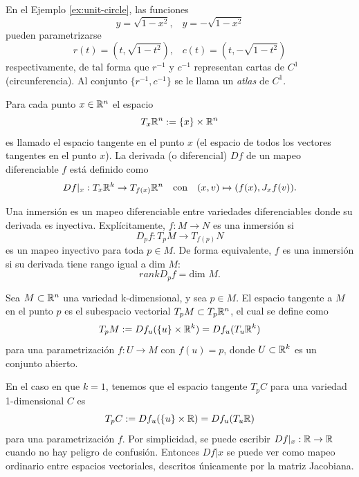 \begin{example}
    En el Ejemplo \ref{ex:unit-circle}, las funciones 
    $$y = \sqrt{1-x^{2}} \text{,} \quad y = -\sqrt{1-x^{2}}$$
    pueden parametrizarse
    $$ r(t)=(t,\sqrt{1-t^{2}}) \text{,} \quad c(t)=(t,-\sqrt{1-t^{2}}) $$
    respectivamente, de tal forma que $r^{-1}$ y $c^{-1}$ representan cartas
    de $C^{1}$ (circunferencia). Al conjunto $\{r^{-1}, c^{-1}\}$ se le llama
    un \emph{atlas} de $C^{1}$.
\end{example}

\begin{definition}
    Para cada punto $x \in \mathbb{R}^{n}$ el espacio
    $$ T_{x}\mathbb{R}^{n} := \{x\} \times \mathbb{R}^{n} $$
    es llamado el espacio tangente en el punto $x$ (el espacio de todos los vectores
    tangentes en el punto $x$). La derivada (o diferencial) $Df$ de un mapeo diferenciable
    $f$ est\'a definido como
    $$ Df|_{x}: T_{x}\mathbb{R}^{k} \rightarrow T_{f(x)}\mathbb{R}^{n} \quad \text{con} \quad
    (x,v) \mapsto (f(x),J_{x}f(v)) \text{.} $$
\end{definition}

\begin{definition}\label{def:immersion}
    Una inmersi\'on es un mapeo diferenciable entre variedades diferenciables donde su
    derivada es inyectiva. Expl\'icitamente, $f:M \rightarrow N$ es una inmersi\'on si
    $$ D_{p}f: T_{p}M \rightarrow T_{f(p)}N $$
    es un mapeo inyectivo para toda $p \in M$. De forma equivalente, $f$ es una inmersi\'on
    si su derivada tiene rango igual a dim $M$:
    $$ rank D_{p}f = \text{dim }M \text{.} $$
\end{definition}

\begin{definition}
    Sea $M \subset \mathbb{R}^{n}$ una variedad k-dimensional, y sea $p \in M$. El
    espacio tangente a $M$ en el punto $p$ es el subespacio vectorial $T_{p}M \subset T_{p}\mathbb{R}^{n}$,
    el cual se define como
    $$ T_{p}M := Df_{u}(\{u\} \times \mathbb{R}^{k})=Df_{u}(T_{u}\mathbb{R}^{k}) $$
    para una parametrizaci\'on $f:U \rightarrow M$ con $f(u) = p$, donde $U \subset \mathbb{R}^{k}$ es
    un conjunto abierto.
\end{definition}

\begin{example}
    En el caso en que $k=1$, tenemos que el espacio tangente $T_{p}C$ para una variedad 1-dimensional
    $C$ es
    $$ T_{p}C := Df_{u}(\{u\} \times \mathbb{R})=Df_{u}(T_{u}\mathbb{R}) $$
    para una parametrizaci\'on $f$. Por simplicidad, se puede escribir $Df|_{x}: \mathbb{R} \rightarrow \mathbb{R}$
    cuando no hay peligro de confusi\'on. Entonces $Df|x$ se puede ver como mapeo
    ordinario entre espacios vectoriales, descritos \'unicamente por la matriz Jacobiana.
\end{example}

